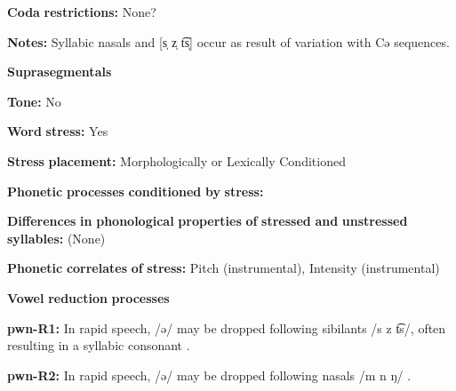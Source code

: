 \begin{styleBody}
\textbf{Coda} \textbf{restrictions:} None?
\end{styleBody}

\begin{styleBody}
\textbf{Notes:} Syllabic nasals and [s̩ z̩ t͡s̩] occur as result of variation with Cə sequences.
\end{styleBody}

\begin{styleBody}
\textbf{Suprasegmentals}
\end{styleBody}

\begin{styleBody}
\textbf{Tone:} No
\end{styleBody}

\begin{styleBody}
\textbf{Word} \textbf{stress:} Yes
\end{styleBody}

\begin{styleBody}
\textbf{Stress} \textbf{placement:} Morphologically or Lexically Conditioned
\end{styleBody}

\begin{styleBody}
\textbf{Phonetic} \textbf{processes} \textbf{conditioned} \textbf{by} \textbf{stress:}
\end{styleBody}

\begin{styleBody}
\textbf{Differences} \textbf{in} \textbf{phonological} \textbf{properties} \textbf{of} \textbf{stressed} \textbf{and} \textbf{unstressed} \textbf{syllables:} (None)
\end{styleBody}

\begin{styleBody}
\textbf{Phonetic} \textbf{correlates} \textbf{of} \textbf{stress:} Pitch (instrumental), Intensity (instrumental)
\end{styleBody}

\begin{styleBody}
\textbf{Vowel} \textbf{reduction} \textbf{processes}
\end{styleBody}

\begin{styleBody}
\textbf{pwn-R1:} In rapid speech, /ə/ may be dropped following sibilants /s z t͡s/, often resulting in a syllabic consonant \citep[40-41]{Chang2006}.
\end{styleBody}

\begin{styleBody}
\textbf{pwn-R2:} In rapid speech, /ə/ may be dropped following nasals /m n ŋ/ \citep[41]{Chang2006}.
\end{styleBody}

